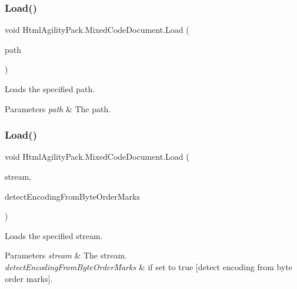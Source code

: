 \subsubsection{\texorpdfstring{Load()}{Load()}\hspace{0.1cm}{\footnotesize\ttfamily [3/11]}}
{\footnotesize\ttfamily void Html\+Agility\+Pack.\+Mixed\+Code\+Document.\+Load (\begin{DoxyParamCaption}\item[{string}]{path }\end{DoxyParamCaption})\hspace{0.3cm}{\ttfamily [inline]}}



Loads the specified path. 


\begin{DoxyParams}{Parameters}
{\em path} & The path.\\
\hline
\end{DoxyParams}
\mbox{\label{class_html_agility_pack_1_1_mixed_code_document_a46f1ad69cccbcb03a86533948a240e67}} 
\subsubsection{\texorpdfstring{Load()}{Load()}\hspace{0.1cm}{\footnotesize\ttfamily [4/11]}}
{\footnotesize\ttfamily void Html\+Agility\+Pack.\+Mixed\+Code\+Document.\+Load (\begin{DoxyParamCaption}\item[{Stream}]{stream,  }\item[{bool}]{detect\+Encoding\+From\+Byte\+Order\+Marks }\end{DoxyParamCaption})\hspace{0.3cm}{\ttfamily [inline]}}



Loads the specified stream. 


\begin{DoxyParams}{Parameters}
{\em stream} & The stream.\\
\hline
{\em detect\+Encoding\+From\+Byte\+Order\+Marks} & if set to {\ttfamily true} \mbox{[}detect encoding from byte order marks\mbox{]}.\\
\hline
\end{DoxyParams}
\mbox{\label{class_html_agility_pack_1_1_mixed_code_document_ab122cc473dbdec79c070d14e81b0535a}} 
